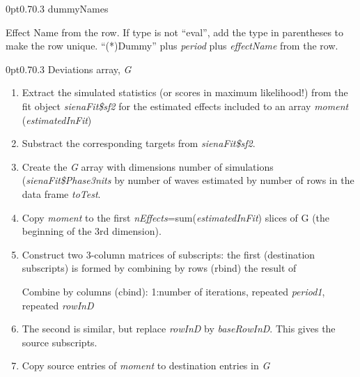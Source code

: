 \documentclass[12pt,a4paper]{article}
\makeatletter
\renewcommand{\=}{\,=\,}
\newcommand{\+}{\,+\,}
\newcommand{\nnm}[1]{\textsf{\small\textit{#1}}}
\renewcommand{\subsection}{\@startsection{subsection}{2}
                {0pt}{0.7\baselineskip}{0.3\baselineskip}
                {\sffamily} }
\makeatother
\begin{document}
\subsection{dummyNames}
\label{sec:dummyNames}
\begin{algorithmic}
\STATE Effect Name from the row. If type is not ``eval'',
add the type in parentheses
to make the row unique.
\ELSE
\STATE ``(*)Dummy'' plus \nnm{period} plus  \nnm{effectName} from the row.
\ENDIF
\end{algorithmic}
\subsection{Deviations array, \nnm{G}}
\label{sec:moment}
\begin{enumerate}
\item Extract the simulated statistics (or scores in maximum likelihood!)
 from the fit object \nnm{sienaFit\$sf2} for the estimated effects
 included to an array \nnm{moment} (\nnm{estimatedInFit})
\item Substract the corresponding targets from \nnm{sienaFit\$sf2}.
\item Create the \nnm{G} array with
  dimensions number of simulations (\nnm{sienaFit\$Phase3nits} by number of
  waves estimated by number of rows in the data frame \nnm{toTest}.
\item Copy \nnm{moment} to the first \nnm{nEffects}=sum(\nnm{estimatedInFit})
  slices of G (the beginning of the 3rd dimension).
\item Construct two 3-column matrices of subscripts:
  the first (destination subscripts) is formed by combining by rows
  (\textsf{rbind}) the result of
\begin{algorithmic}
\STATE Combine by
  columns (\textsf{cbind}): 1:number of iterations, repeated \nnm{period1},
  repeated \nnm{rowInD}
\ENDFOR
\end{algorithmic}
\item The second is similar, but replace \nnm{rowInD} by \nnm{baseRowInD}.
This gives the source subscripts.
\item Copy source entries of \nnm{moment} to destination entries in \nnm{G}
\end{enumerate}
\end{document}
